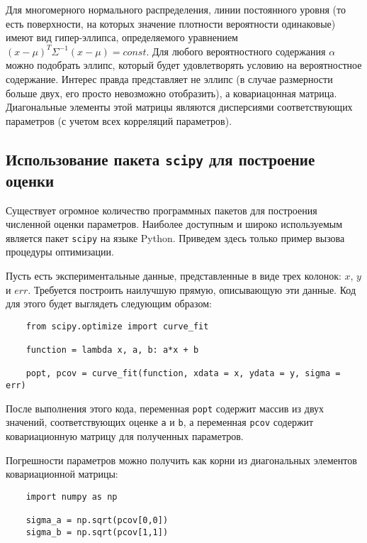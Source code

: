 Для многомерного нормального распределения, линии постоянного уровня (то
есть поверхности, на которых значение плотности вероятности одинаковые)
имеют вид гипер-эллипса, определяемого уравнением
$(x - \mu)^T \Sigma^{-1} (x - \mu) = const$. Для любого вероятностного
содержания $\alpha$ можно подобрать эллипс, который будет
удовлетворять условию на вероятностное содержание. Интерес правда
представляет не эллипс (в случае размерности больше двух, его просто
невозможно отобразить), а ковариацонная матрица. Диагональные элементы
этой матрицы являются дисперсиями соответствующих параметров (с учетом
всех корреляций параметров).

\subsection{Использование пакета \texttt{scipy} для построение оценки}

Существует огромное количество программных пакетов для построения численной оценки параметров. Наиболее доступным и широко используемым является пакет \texttt{scipy} на языке Python. Приведем здесь только пример вызова процедуры оптимизации.

Пусть есть экспериментальные данные, представленные в виде трех колонок: $x$, $y$ и $err$. Требуется построить наилучшую прямую, описывающую эти данные.
Код для этого будет выглядеть следующим образом:
\begin{verbatim}
    from scipy.optimize import curve_fit

    function = lambda x, a, b: a*x + b

    popt, pcov = curve_fit(function, xdata = x, ydata = y, sigma = err)
\end{verbatim}

После выполнения этого кода, переменная \texttt{popt} содержит массив из двух значений, соответствующих оценке \texttt{a} и \texttt{b}, а переменная \texttt{pcov} содержит ковариационную матрицу для полученных параметров. 

Погрешности параметров можно получить как корни из диагональных элементов ковариационной матрицы:
\begin{verbatim}
    import numpy as np
    
    sigma_a = np.sqrt(pcov[0,0])
    sigma_b = np.sqrt(pcov[1,1])
\end{verbatim}




